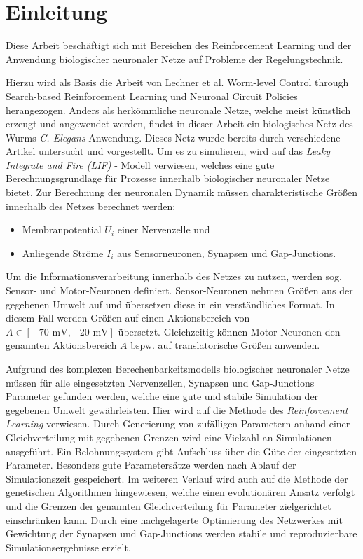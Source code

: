 %
\chapter{Einleitung}
\label{chap:einleitung}
%

	Diese Arbeit beschäftigt sich mit Bereichen des Reinforcement Learning und der Anwendung biologischer neuronaler Netze auf Probleme der Regelungstechnik. 
	
	Hierzu wird als Basis die Arbeit von Lechner et al. \glqq Worm-level Control through Search-based Reinforcement Learning\grqq{} \cite{WormLevelRL} und \glqq Neuronal Circuit Policies\grqq{} \cite{NeuralPolicies} herangezogen. Anders als herkömmliche neuronale Netze, welche meist künstlich erzeugt und angewendet werden, findet in dieser Arbeit ein biologisches Netz des Wurms \textit{C. Elegans} Anwendung. Dieses Netz wurde bereits durch verschiedene Artikel \cite{CElegans} \cite{SimCE} \cite{Wicks1996} untersucht und vorgestellt. Um es zu simulieren, wird auf das \textit{Leaky Integrate and Fire (LIF)} -  Modell verwiesen, welches eine gute Berechnungsgrundlage für Prozesse innerhalb biologischer neuronaler Netze bietet. Zur Berechnung der neuronalen Dynamik müssen charakteristische Größen innerhalb des Netzes berechnet werden:
	\begin{itemize}
		\item Membranpotential $U_i$ einer Nervenzelle und
		\item Anliegende Ströme $I_i$ aus Sensorneuronen, Synapsen und Gap-Junctions.
	\end{itemize}
	Um die Informationsverarbeitung innerhalb des Netzes zu nutzen, werden sog. Sensor- und Motor-Neuronen definiert. Sensor-Neuronen nehmen Größen aus der gegebenen Umwelt auf und übersetzen diese in ein verständliches Format. In diesem Fall werden Größen auf einen Aktionsbereich von $A \in [-70\text{ mV}, -20\text{ mV}]$ übersetzt. Gleichzeitig können Motor-Neuronen den genannten Aktionsbereich $A$ bspw. auf translatorische Größen anwenden.
	
	Aufgrund des komplexen Berechenbarkeitsmodells biologischer neuronaler Netze müssen für alle eingesetzten Nervenzellen, Synapsen und Gap-Junctions Parameter gefunden werden, welche eine gute und stabile Simulation der gegebenen Umwelt gewährleisten. Hier wird auf die Methode des \textit{Reinforcement Learning} verwiesen. Durch Generierung von zufälligen Parametern anhand einer Gleichverteilung mit gegebenen Grenzen wird eine Vielzahl an Simulationen ausgeführt. Ein Belohnungssystem gibt Aufschluss über die Güte der eingesetzten Parameter. Besonders gute Parametersätze werden nach Ablauf der Simulationszeit gespeichert. Im weiteren Verlauf wird auch auf die Methode der genetischen Algorithmen hingewiesen, welche einen evolutionären Ansatz verfolgt und die Grenzen der genannten Gleichverteilung für Parameter zielgerichtet einschränken kann.
	Durch eine nachgelagerte Optimierung des Netzwerkes mit Gewichtung der Synapsen und Gap-Junctions werden stabile und reproduzierbare Simulationsergebnisse erzielt.
	
